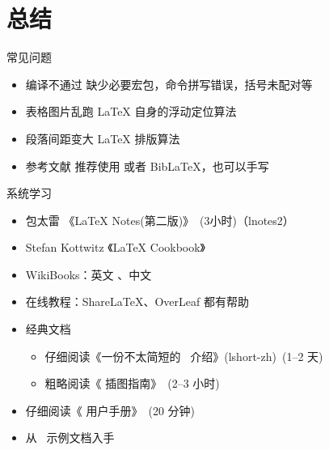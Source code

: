 
\section{总结}

\begin{frame}{常见问题}
  \begin{itemize}
    \item \alert{编译不通过} 缺少必要宏包，命令拼写错误，括号未配对等
    \item \alert{表格图片乱跑} \LaTeX{} 自身的浮动定位算法
    \item \alert{段落间距变大} \LaTeX{} 排版算法
    \item \alert{参考文献} 推荐使用 \BibTeX{} 或者 Bib\LaTeX{}，也可以手写  
  \end{itemize}
\end{frame}

\begin{frame}{系统学习}
  \begin{itemize}
      \item 包太雷 《\LaTeX{} Notes(第二版)》~(3小时)（lnotes2） 
      \item Stefan Kottwitz 《LaTeX Cookbook》
      \item WikiBooks：英文 、中文 
      \item 在线教程：ShareLaTeX、OverLeaf 都有帮助
      \item 经典文档
        \begin{itemize}
          \item 仔细阅读《一份不太简短的~\LaTeXe{} 介绍》(lshort-zh)~(1--2 天)
          \item 粗略阅读《\LaTeXe{} 插图指南》~(2--3 小时)
        \end{itemize}
      \item 仔细阅读《\ThuThesis{} 用户手册》~(20 分钟)
      \item 从~\ThuThesis{} 示例文档入手
  \end{itemize}
\end{frame}

